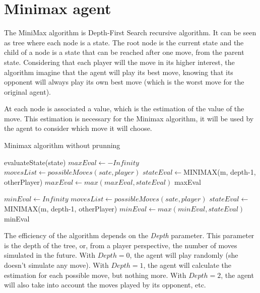 \documentclass{article}
\begin{document}

\section{Minimax agent}
The MiniMax algorithm is Depth-First Search recursive algorithm. It can be seen as tree where each node is a state.
The root node is the current state and the child of a node is a state that can be reached after one move, from the parent state.
Considering that each player will the move in its higher interest, the algorithm imagine that the agent will play its best move, knowing that its opponent will always play its own best move (which is the worst move for the original agent).

At each node is associated a value, which is the estimation of the value of the move. This estimation is necessary for the Minimax algorithm, it will be used by the agent to consider which move it will choose.

\begin{algorithm}[H] %
	\caption{Minimax algorithm without prunning}
    \label{alg:minimax}
	\begin{algorithmic}[1]
	            \Return evaluateState(state)
	       \EndIf
    	        \State $maxEval \gets -Infinity$
    	        \State $movesList \gets possibleMoves(sate, player)$
    	                \State $stateEval \gets $MINIMAX(m, depth-1, otherPlayer)
                        \State $maxEval \gets max(maxEval, stateEval)$
    	       \EndFor
    	       \State \Return maxEval

	       \Else
	            \State $minEval \gets Infinity$
    	        \State $movesList \gets possibleMoves(sate, player)$
    	       	     \State $stateEval \gets $ MINIMAX(m, depth-1, otherPlayer)
                     \State $minEval \gets max(minEval, stateEval)$
    	       \EndFor
    	       \State \Return minEval
	       \EndIf

	      \EndFunction

	\end{algorithmic}
\end{algorithm}
The efficiency of the algorithm depends on the \textit{Depth} parameter. This parameter is the depth of the tree, or, from a player perspective, the number of moves simulated in the future. With $Depth = 0$, the agent will play randomly (she doesn't simulate any move).
With $Depth = 1$, the agent will calculate the estimation for each possible move, but nothing more. With $Depth = 2$, the agent will also take into account the moves played by its opponent, etc.
\end{document}
